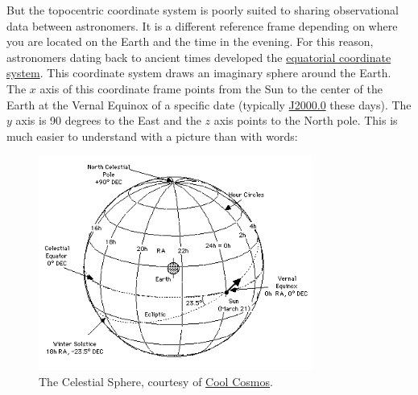 But the topocentric coordinate system is poorly suited to sharing observational data between astronomers.
It is a different reference frame depending on where you are located on the Earth and the time in the evening.
For this reason, astronomers dating back to ancient times developed the \href{https://en.wikipedia.org/wiki/Equatorial_coordinate_system}{equatorial coordinate system}.
This coordinate system draws an imaginary sphere around the Earth.
The $x$ axis of this coordinate frame points from the Sun to the center of the Earth at the Vernal Equinox of a specific date 
(typically \href{https://en.wikipedia.org/wiki/Epoch_(astronomy)}{J2000.0} these days).
The $y$ axis is 90 degrees to the East and the $z$ axis points to the North pole.
This is much easier to understand with a picture than with words:
\begin{figure}[hbt!]
\begin{center}
\includegraphics[width=0.8\textwidth]{../figs/web/celestial_sphere.png}
\caption[The Celestial Sphere]
{The Celestial Sphere, courtesy of \href{http://coolcosmos.ipac.caltech.edu/cosmic_classroom/cosmic_reference/coordsys.html}{Cool Cosmos}.}
\end{center}
\end{figure}

